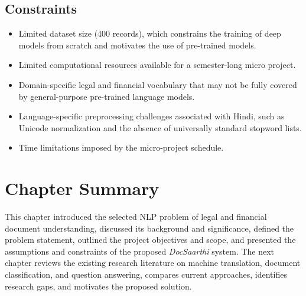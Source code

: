 \subsection*{Constraints}

\begin{itemize}
    \item Limited dataset size (400 records), which constrains the training of deep models from scratch and motivates the use of pre-trained models.
    \item Limited computational resources available for a semester-long micro project.
    \item Domain-specific legal and financial vocabulary that may not be fully covered by general-purpose pre-trained language models.
    \item Language-specific preprocessing challenges associated with Hindi, such as Unicode normalization and the absence of universally standard stopword lists.
    \item Time limitations imposed by the micro-project schedule.
\end{itemize}


\section*{Chapter Summary}

This chapter introduced the selected NLP problem of legal and financial document understanding, discussed its background and significance, defined the problem statement, outlined the project objectives and scope, and presented the assumptions and constraints of the proposed \textit{DocSaarthi} system. The next chapter reviews the existing research literature on machine translation, document classification, and question answering, compares current approaches, identifies research gaps, and motivates the proposed solution.

